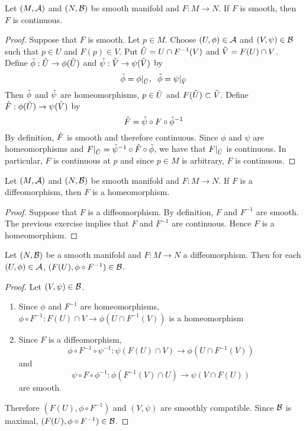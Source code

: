 \documentclass{book}
\begin{document}
	\begin{ex}
	Let $(M, \mathcal{A})$ and $(N, \mathcal{B})$ be smooth manifold and $F: M \rightarrow N$. If $F$ is smooth, then $F$ is continuous. 
	\end{ex}
	
	\begin{proof}
	Suppose that $F$ is smooth. Let $p \in M$. Choose $(U, \phi) \in \mathcal{A}$ and $(V, \psi) \in \mathcal{B}$ such that $p \in U$ and $F(p) \in V$. Put $\tilde{U} = U \cap F^{-1}(V)$ and $\tilde{V} = F(U) \cap V$. \\
	Define $\tilde{\phi}: \tilde{U} \rightarrow \phi(\tilde{U})$ and $\tilde{\psi}: \tilde{V} \rightarrow \psi(\tilde{V})$ by $$\tilde{\phi} = \phi|_{\tilde{U}}, \hspace{.2cm} \tilde{\phi} = \psi|_{\tilde{V}}$$ Then $\tilde{\phi}$ and $\tilde{\psi}$ are homeomorphisms, $p \in \tilde{U}$ and $F(\tilde{U}) \subset \tilde{V}$. Define $\tilde{F}: \phi(\tilde{U}) \rightarrow \psi(\tilde{V}) $ by $$ \tilde{F} = \tilde{\psi} \circ F \circ \tilde{\phi}^{-1}$$  
	By definition, $\tilde{F}$ is smooth and therefore continuous. Since $\phi$ and $\psi$ are homeomorphisms and $F|_{\tilde{U}} = \tilde{\psi}^{-1} \circ \tilde{F} \circ \tilde{\phi}$, we have that $F|_{\tilde{U}}$ is continuous. In particular, $F$ is continuous at $p$ and since $p \in M$ is arbitrary, $F$ is continuous.
	\end{proof}
	
	\begin{ex}
	Let $(M, \mathcal{A})$ and $(N, \mathcal{B})$ be smooth manifold and $F: M \rightarrow N$. If $F$ is a diffeomorphism, then $F$ is a homeomorphism. 
	\end{ex}	
	
	\begin{proof}
	Suppose that $F$ is a diffeomorphism. By definition, $F$ and  $F^{-1}$ are smooth. The previous exercise implies that $F$ and $F^{-1}$ are continuous. Hence $F$  is a homeomorphism. 
	\end{proof}
	
	\begin{ex}
		Let $(N, \mathcal{B})$ be a smooth manifold and $F: M \rightarrow N$ a diffeomorphism. Then for each $(U, \phi) \in \mathcal{A}$, $(F(U), \phi \circ F^{-1}) \in \mathcal{B}$.
	\end{ex}
	
	\begin{proof}
		Let $(V, \psi) \in \mathcal{B}$. 
		\begin{enumerate}
		\item Since $\phi$ and $F^{-1}$ are homeomorphisms, $\phi \circ F^{-1}: F(U) \cap V \rightarrow \phi(U \cap F^{-1}(V))$ is a homeomorphism
		\item Since $F$ is a diffeomorphism, $$\phi \circ F^{-1} \circ \psi^{-1}: \psi(F(U) \cap V) \rightarrow \phi(U \cap F^{-1}(V))$$ and $$\psi \circ F \circ \phi^{-1}: \phi(F^{-1}(V) \cap U) \rightarrow \psi(V \cap F(U))$$ are smooth. 
		\end{enumerate}
		
		Therefore $(F(U), \phi \circ F^{-1})$ and $(V, \psi)$ are smoothly compatible. Since $\mathcal{B}$ is maximal, $(F(U), \phi \circ F^{-1}) \in \mathcal{B}$.
	\end{proof}
\end{document}

